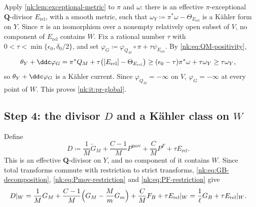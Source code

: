 Apply \cref{nk:lem:exceptional-metric} to $\pi$ and $\omega$: there is
an effective $\pi$-exceptional $\mathbf Q$-divisor $E_{{\mathrm{rel}}}$, with
a smooth metric, such that $\omega_Y\coloneqq \pi^*\omega-\Theta_{E_{{\mathrm{rel}}}}$
is a K\"ahler form on $Y$. Since $\pi$ is an isomorphism over a
nonempty relatively open subset of $V$, no component of $E_{{\mathrm{rel}}}$
contains $W$. Fix a rational number $\tau$ with
$0<\tau<\min\{\epsilon_0,\delta_0/2\}$, and set
$\varphi_G\coloneqq \varphi_{Q_M}\circ\pi+\tau\psi_{E_{{\mathrm{rel}}}}$. By
\eqref{nk:eq:QM-positivity},
\[
  \theta_Y+\ddc\varphi_G
  =\pi^*Q_M+\tau\bigl([E_{{\mathrm{rel}}}]-\Theta_{E_{{\mathrm{rel}}}}\bigr)
  \ge(\epsilon_0-\tau)\pi^*\omega+\tau\omega_Y
  \ge\tau\omega_Y ,
\]
so $\theta_Y+\ddc\varphi_G$ is a K\"ahler current. Since
$\varphi_{Q_M}=-\infty$ on $V$, $\varphi_G=-\infty$ at every point of $W$. This proves
\ref{nk:it:pr-global}.

\subsection*{Step 4: the divisor \texorpdfstring{$D$}{D} and a K\"ahler class on \texorpdfstring{$W$}{W}}

Define
\begin{equation}\label{nk:eq:def-DLY}
  D\coloneqq \frac1M\widetilde G_M+\frac{C-1}MP^{{\mathrm{mov}}}+\frac CMP^F+\tau E_{{\mathrm{rel}}}.
\end{equation}
This is an effective
$\mathbf Q$-divisor on $Y$, and no component of it
contains $W$. Since total transforms commute
with restriction to strict transforms, \eqref{nk:eq:GB-decomposition},
\eqref{nk:eq:Pmov-restriction} and \eqref{nk:eq:PF-restriction} give
\begin{equation}\label{nk:eq:DL-restriction}
  D|_W=\frac1MG_M+\frac{C-1}M\Bigl(G_M-\frac MmG_m\Bigr)+\frac CMF_B
       +\tau E_{{\mathrm{rel}}}|_W
  =\frac1\ell G_B+\tau E_{{\mathrm{rel}}}|_W .
\end{equation}

